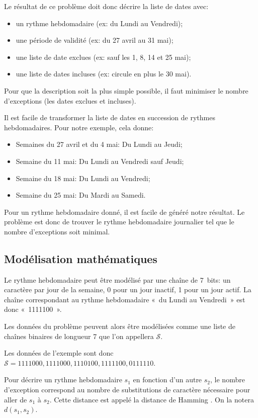 \documentclass{roadef}
\def\S{\mathcal{S}}
\begin{document}
Le résultat de ce problème doit donc décrire la liste de dates avec:
\begin{itemize}
\item un rythme hebdomadaire (ex: du Lundi au Vendredi);
\item une période de validité (ex: du 27 avril au 31 mai);
\item une liste de date exclues (ex: sauf les 1, 8, 14 et 25 mai);
\item une liste de dates incluses (ex: circule en plus le 30 mai).
\end{itemize}

Pour que la description soit la plus simple possible, il faut
minimiser le nombre d'exceptions (les dates exclues et incluses).

Il est facile de transformer la liste de dates en succession de
rythmes hebdomadaires. Pour notre exemple, cela donne:
\begin{itemize}
\item Semaines du 27 avril et du 4 mai: Du Lundi au Jeudi;
\item Semaine du 11 mai: Du Lundi au Vendredi sauf Jeudi;
\item Semaine du 18 mai: Du Lundi au Vendredi;
\item Semaine du 25 mai: Du Mardi au Samedi.
\end{itemize}

Pour un rythme hebdomadaire donné, il est facile de généré notre
résultat.  Le problème est donc de trouver le rythme hebdomadaire
journalier tel que le nombre d'exceptions soit minimal.

\subsection{Modélisation mathématiques}

Le rythme hebdomadaire peut être modélisé par une chaîne de 7~bits: un
caractère par jour de la semaine, 0 pour un jour inactif, 1 pour un
jour actif. La chaîne correspondant au rythme hebdomadaire «~du Lundi
au Vendredi~» est donc «~1111100~».

Les données du problème peuvent alors être modélisées comme une liste
de chaînes binaires de longueur 7 que l'on appellera $\S$.

Les données de l'exemple sont donc
\begin{math}
  \S = 1111000, 1111000, 1110100, 1111100, 0111110
\end{math}.

Pour décrire un rythme hebdomadaire $s_1$ en fonction d'un autre
$s_2$, le nombre d'exception correspond au nombre de substitutions de
caractère nécessaire pour aller de $s_1$ à $s_2$. Cette distance est
appelé la distance de Hamming \cite{hamming1950error}. On la notera
$d(s_1, s_2)$.
\end{document}
